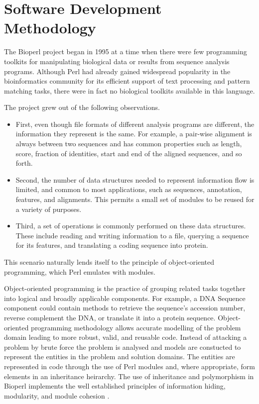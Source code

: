 \documentclass[12pt]{article}
\begin{document}
\section{Software Development Methodology}

The Bioperl project began in 1995 \cite{chervitz-bits} at a time when
there were few programming toolkits for manipulating biological data
or results from sequence analysis programs.  Although Perl had already
gained widespread popularity in the bioinformatics community for its
efficient support of text processing and pattern matching tasks, there
were in fact no biological toolkits available in this language.

The project grew out of the following observations.  
\begin{itemize}

\item First, even though file formats of different analysis programs
are different, the information they represent is the same.  For
example, a pair-wise alignment is always between two sequences and has
common properties such as length, score, fraction of identities, start
and end of the aligned sequences, and so forth.

\item Second, the number of data structures needed to represent
information flow is limited, and common to most applications, such as
sequences, annotation, features, and alignments.  This permits a 
small set of modules to be reused for a variety of purposes.

\item Third, a set of operations is commonly performed on these data
structures.  These include reading and writing information to a file,
querying a sequence for its features, and translating a coding
sequence into protein.

\end{itemize}

This scenario naturally lends itself to the principle of
object-oriented programming, which Perl emulates with modules.

Object-oriented programming is the practice of grouping related tasks
together into logical and broadly applicable components.  For example,
a DNA Sequence component could contain methods to retrieve the
sequence's accession number, reverse complement the DNA, or translate
it into a protein sequence.  Object-oriented programming methodology
allows accurate modelling of the problem domain leading to more
robust, valid, and reusable code. Instead of attacking a problem by
brute force the problem is analysed and models are constucted to
represent the entities in the problem and solution domains. The
entities are represented in code through the use of Perl modules and,
where appropriate, form elements in an inheritance heirarchy.  The use
of inheritance and polymorphism in Bioperl implements the well
established principles of information hiding, modularity, and module
cohesion \cite{tremblay}.
\end{document}
